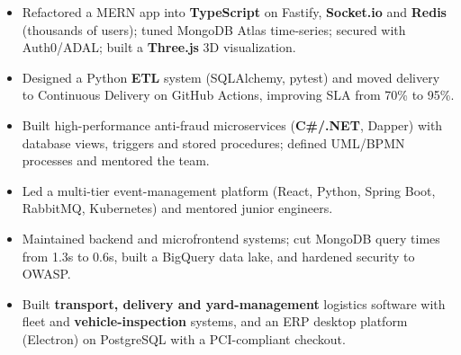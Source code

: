 \documentclass[10pt,a4paper]{altacv}
\begin{document}
\begin{itemize}
\item Refactored a MERN app into \textbf{TypeScript} on Fastify, \textbf{Socket.io} and \textbf{Redis} (thousands of users); tuned MongoDB Atlas time-series; secured with Auth0/ADAL; built a \textbf{Three.js} 3D visualization.
\end{itemize}
\divider

\begin{itemize}
\item Designed a Python \textbf{ETL} system (SQLAlchemy, pytest) and moved delivery to Continuous Delivery on GitHub Actions, improving SLA from 70\% to 95\%.
\end{itemize}
\divider

\begin{itemize}
\item Built high-performance anti-fraud microservices (\textbf{C\#/.NET}, Dapper) with database views, triggers and stored procedures; defined UML/BPMN processes and mentored the team.
\end{itemize}
\divider

\begin{itemize}
\item Led a multi-tier event-management platform (React, Python, Spring Boot, RabbitMQ, Kubernetes) and mentored junior engineers.
\end{itemize}
\divider

\begin{itemize}
\item Maintained backend and microfrontend systems; cut MongoDB query times from 1.3s to 0.6s, built a BigQuery data lake, and hardened security to OWASP.
\end{itemize}
\divider

\begin{itemize}
\item Built \textbf{transport, delivery and yard-management} logistics software with fleet and \textbf{vehicle-inspection} systems, and an ERP desktop platform (Electron) on PostgreSQL with a PCI-compliant checkout.
\end{itemize}
\divider
\end{document}
